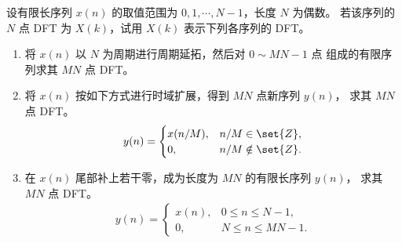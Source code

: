 \begin{homework}
    设有限长序列 $x(n)$ 的取值范围为 $0, 1, \cdots, N-1$，长度 $N$ 为偶数。
    若该序列的 $N$ 点 DFT 为 $X(k)$，试用 $X(k)$ 表示下列各序列的 DFT。
    \begin{enumerate}[label=(\arabic*)]
        \item 将 $x(n)$ 以 $N$ 为周期进行周期延拓，然后对 $0 \sim MN-1$ 点
            组成的有限序列求其 $MN$ 点 DFT。
        \item 将 $x(n)$ 按如下方式进行时域扩展，得到 $MN$ 点新序列 $y(n)$，
            求其 $MN$ 点 DFT。
            \begin{align*}
                y(n) = \begin{cases}
                    x(n/M), & n/M \in \set{Z}, \\
                    0, & n/M \notin \set{Z}.
                \end{cases}
            \end{align*}
        \item 在 $x(n)$ 尾部补上若干零，成为长度为 $MN$ 的有限长序列 $y(n)$，
            求其 $MN$ 点 DFT。
            \begin{align*}
                y(n) = \begin{cases}
                    x(n), & 0 \le n \le N - 1, \\
                    0, & N \le n \le MN - 1.
                \end{cases}
            \end{align*}
    \end{enumerate}
\end{homework}

